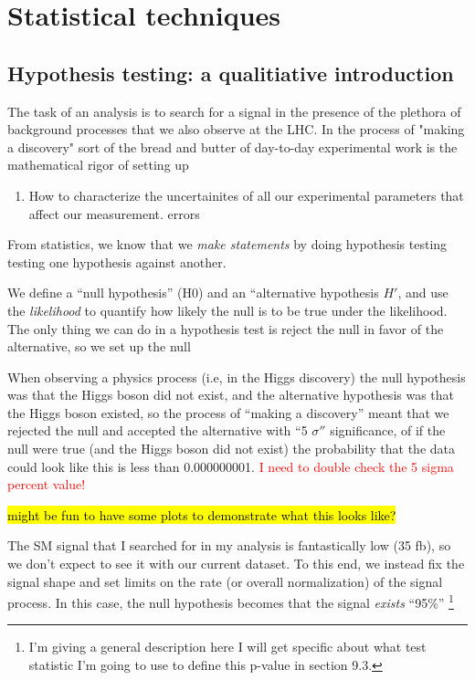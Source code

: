 \chapter{Statistical techniques}

\section{Hypothesis testing: a qualitiative introduction}

The task of an analysis is to search for a signal in the presence of the plethora of background processes that we also observe at the LHC.
In the process of "making a discovery" sort of the bread and butter of day-to-day experimental work is the mathematical rigor of setting up
\begin{enumerate}
	\item How to characterize the uncertainites of all our experimental parameters that affect our measurement. errors
\end{enumerate}

From statistics, we know that we \emph{make statements} by doing hypothesis testing testing one hypothesis against another.

We define a ``null hypothesis'' (H0) and an ``alternative hypothesis $H'$, and use the \emph{likelihood} to quantify how likely the null is to be true under the likelihood.
The only thing we can do in a hypothesis test is reject the null in favor of the alternative, so we set up the null 

When observing a physics process (i.e, in the Higgs discovery) the null hypothesis was that the Higgs boson did not exist, and the alternative hypothesis was that the Higgs boson existed, so the process of ``making a discovery'' meant that we rejected the null and accepted the alternative with ``5 $\sigma''$ significance, of if the null were true (and the Higgs boson did not exist) the probability that the data could look like this is less than 0.000000001. \textcolor{red}{I need to double check the 5 sigma percent value!}

\hl{might be fun to have some plots to demonstrate what this looks like?}

The SM signal that I searched for in my analysis is fantastically low (35 fb), so we don't expect to see it with our current dataset.
To this end, we instead fix the signal shape and set limits on the rate (or overall normalization) of the signal process. In this case, the null hypothesis becomes that the signal \emph{exists} ``95\%'' \footnote{I'm giving a general description here I will get specific about what test statistic I'm going to use to define this p-value in section 9.3.}


